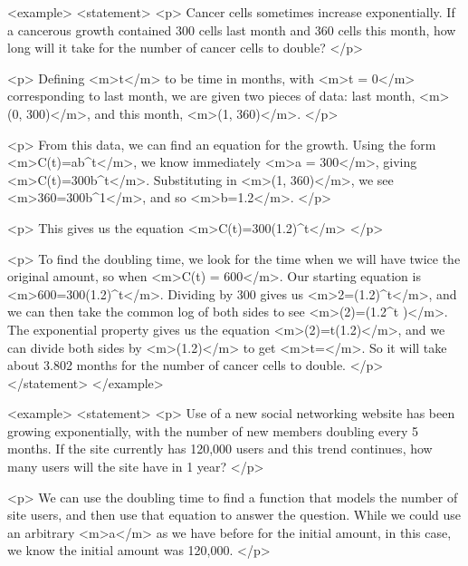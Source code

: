         <example>
            <statement>
                <p>
                    Cancer cells sometimes increase exponentially.
                    If a cancerous growth contained 300 cells last month and 360 cells this month, how long will it take for the number of cancer cells to double?
                </p>

                <p>
                    Defining <m>t</m> to be time in months, with <m>t = 0</m> corresponding to last month, we are given two pieces of data: last month, <m>(0, 300)</m>, and this month, <m>(1, 360)</m>.
                </p>

                <p>
                    From this data, we can find an equation for the growth.
                    Using the form <m>C(t)=ab^{t}</m>, we know immediately <m>a = 300</m>, giving <m>C(t)=300b^{t}</m>.
                    Substituting in <m>(1, 360)</m>, we see <m>360=300b^{1}</m>, and so <m>b=1.2</m>.
                </p>

                <p>
                    This gives us the equation <m>C(t)=300(1.2)^{t}</m>
                </p>

                <p>
                    To find the doubling time, we look for the time when we will have twice the original amount, so when <m>C(t) = 600</m>.
                    Our starting equation is <m>600=300(1.2)^{t}</m>.
                    Dividing by 300 gives us <m>2=(1.2)^{t}</m>, and we can then take the common log of both sides to see <m>\log(2)=\log(1.2^{t} )</m>.
                    The exponential property gives us the equation <m>\log(2)=t\log(1.2)</m>, and we can divide both sides by <m>\log(1.2)</m> to get <m>t=</m>.
                    So it will take about 3.802 months for the number of cancer cells to double.
                </p>
            </statement>
        </example>

        <example>
            <statement>
                <p>
                    Use of a new social networking website has been growing exponentially, with the number of new members doubling every 5 months.
                    If the site currently has 120,000 users and this trend continues, how many users will the site have in 1 year?
                </p>

                <p>
                    We can use the doubling time to find a function that models the number of site users, and then use that equation to answer the question.
                    While we could use an arbitrary <m>a</m> as we have before for the initial amount, in this case, we know the initial amount was 120,000.
                </p>

